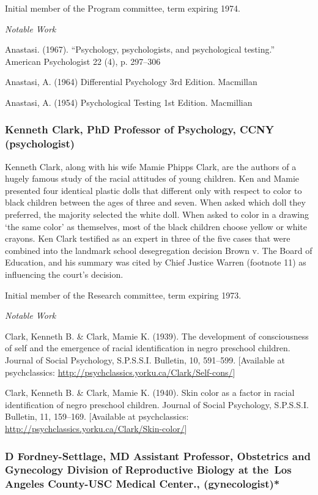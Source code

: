 \begin{refsection}
Initial member of the Program committee, term expiring 1974.

\emph{Notable Work}

Anastasi. (1967). “Psychology, psychologists, and psychological testing.” American Psychologist 22 (4), p. 297--306

Anastasi, A. (1964) Differential Psychology 3rd Edition. Macmillan

Anastasi, A. (1954) Psychological Testing 1st Edition. Macmillian

\subsubsection{Kenneth Clark, PhD Professor of Psychology, CCNY (psychologist)}
\label{kennethclarkphdprofessorofpsychologyccnypsychologist}

Kenneth Clark, along with his wife Mamie Phipps Clark, are the authors of a hugely famous study of the racial attitudes of young children. Ken and Mamie presented four identical plastic dolls that different only with respect to color to black children between the ages of three and seven. When asked which doll they preferred, the majority selected the white doll. When asked to color in a drawing `the same color' as themselves, most of the black children choose yellow or white crayons. Ken Clark testified as an expert in three of the five cases that were combined into the landmark school desegregation decision Brown v. The Board of Education, and his summary was cited by Chief Justice Warren (footnote 11) as influencing the court's decision.

Initial member of the Research committee, term expiring 1973.

\emph{Notable Work}

Clark, Kenneth B. \& Clark, Mamie K. (1939). The development of consciousness of self and the emergence of racial identification in negro preschool children. Journal of Social Psychology, S.P.S.S.I. Bulletin, 10, 591--599. [Available at psychclassics: \url{http://psychclassics.yorku.ca/Clark/Self-cons/}]

Clark, Kenneth B. \& Clark, Mamie K. (1940). Skin color as a factor in racial identification of negro preschool children. Journal of Social Psychology, S.P.S.S.I. Bulletin, 11, 159--169. [Available at psychclassics: \url{http://psychclassics.yorku.ca/Clark/Skin-color/}]

\subsubsection{D Fordney-Settlage, MD Assistant Professor, Obstetrics and Gynecology Division of Reproductive Biology at the Los Angeles County-USC Medical Center., (gynecologist)*}
\label{dfordney-settlagemdassistantprofessorobstetricsandgynecologydivisionofreproductivebiologyatthe losangelescounty-uscmedicalcenter.gynecologist}


\end{refsection}
